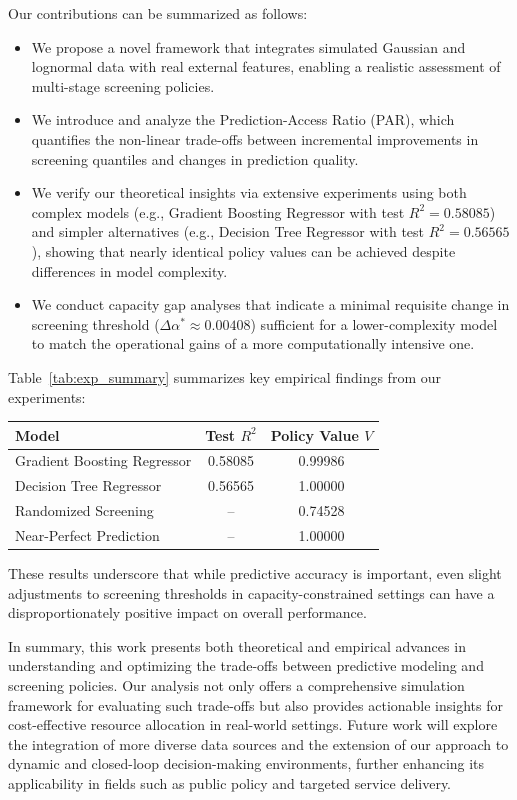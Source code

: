\documentclass[11pt]{article}
\begin{document}
Our contributions can be summarized as follows:
\begin{itemize}
    \item We propose a novel framework that integrates simulated Gaussian and lognormal data with real external features, enabling a realistic assessment of multi-stage screening policies.
    \item We introduce and analyze the Prediction-Access Ratio (PAR), which quantifies the non-linear trade-offs between incremental improvements in screening quantiles and changes in prediction quality.
    \item We verify our theoretical insights via extensive experiments using both complex models (e.g., Gradient Boosting Regressor with test \(R^2 = 0.58085\)) and simpler alternatives (e.g., Decision Tree Regressor with test \(R^2 = 0.56565\)), showing that nearly identical policy values can be achieved despite differences in model complexity.
    \item We conduct capacity gap analyses that indicate a minimal requisite change in screening threshold (\(\Delta \alpha^*\approx 0.00408\)) sufficient for a lower-complexity model to match the operational gains of a more computationally intensive one.
\end{itemize}

Table~\ref{tab:exp_summary} summarizes key empirical findings from our experiments:
\begin{center}
\begin{tabular}{|l|c|c|}
\hline
\textbf{Model} & \textbf{Test \(R^2\)} & \textbf{Policy Value \(V\)} \\
\hline
Gradient Boosting Regressor & 0.58085 & 0.99986 \\
Decision Tree Regressor & 0.56565 & 1.00000 \\
Randomized Screening & -- & 0.74528 \\
Near-Perfect Prediction & -- & 1.00000 \\
\hline
\end{tabular}
\end{center}
These results underscore that while predictive accuracy is important, even slight adjustments to screening thresholds in capacity-constrained settings can have a disproportionately positive impact on overall performance.

In summary, this work presents both theoretical and empirical advances in understanding and optimizing the trade-offs between predictive modeling and screening policies. Our analysis not only offers a comprehensive simulation framework for evaluating such trade-offs but also provides actionable insights for cost-effective resource allocation in real-world settings. Future work will explore the integration of more diverse data sources and the extension of our approach to dynamic and closed-loop decision-making environments, further enhancing its applicability in fields such as public policy and targeted service delivery.
\end{document}
